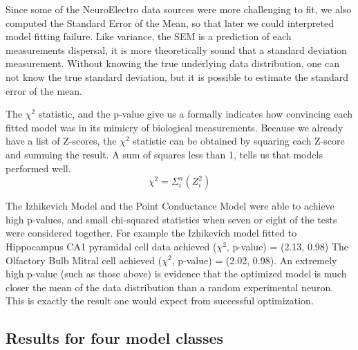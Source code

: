 Since some of the NeuroElectro data sources were more challenging to fit, we also computed the Standard Error of the Mean, so that later we could interpreted model fitting failure. Like variance, the SEM is a prediction of each measurements dispersal, it is more theoretically sound that a standard deviation measurement. Without knowing the true underlying data distribution, one can not know the true standard deviation, but it is possible to estimate the standard error of the mean. 

The $\chi^{2}$ statistic, and the p-value give us a formally indicates how convincing each fitted model was in its mimicry of biological measurements.
Because we already have a list of Z-scores, the $\chi^{2}$ statistic can be obtained by squaring each Z-score and summing the result. A sum of squares less than 1, tells us that models performed well.
\begin{equation}
\chi^{2}=\Sigma_{i}^{n} (Z_{i}^{2})
\end{equation}


The Izhikevich Model and the Point Conductance Model were able to achieve high p-values, and small chi-squared statistics when seven or eight of the tests were considered together.
For example the Izhikevich model fitted to Hippocampus CA1 pyramidal cell data achieved ($\chi^2$, p-value) = (2.13, 0.98)
The Olfactory Bulb Mitral cell achieved ($\chi^2$, p-value) = (2.02, 0.98).
An extremely high p-value (such as those above) is evidence that the optimized model is much closer the mean of the data distribution than a random experimental neuron.
This is exactly the result one would expect from successful optimization.

\subsection{Results for four model classes}

